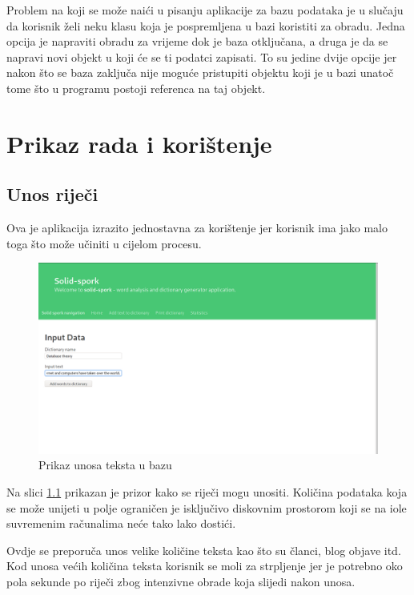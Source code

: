 \documentclass{foi}
\begin{document}
Problem na koji se može naići u pisanju aplikacije za bazu podataka je u
slučaju da korisnik želi neku klasu koja je pospremljena u bazi koristiti za
obradu. Jedna opcija je napraviti obradu za vrijeme dok je baza otključana, a
druga je da se napravi novi objekt u koji će se ti podatci zapisati. To su
jedine dvije opcije jer nakon što se baza zaključa nije moguće pristupiti
objektu koji je u bazi unatoč tome što u programu postoji referenca na taj
objekt.

\chapter{Prikaz rada i korištenje}

\section{Unos riječi}

Ova je aplikacija izrazito jednostavna za korištenje jer korisnik ima jako malo
toga što može učiniti u cijelom procesu.

\begin{figure}[!h]
	\includegraphics[width=\textwidth]{slike/solid-spork-input.png}
	\caption{Prikaz unosa teksta u bazu}
	\label{ht_unos}
\end{figure}

Na slici \ref{ht_unos} prikazan je prizor kako se riječi mogu unositi. Količina
podataka koja se može unijeti u polje ograničen je isključivo diskovnim
prostorom koji se na iole suvremenim računalima neće tako lako dostići.

Ovdje se preporuča unos velike količine teksta kao što su članci, blog objave
itd. Kod unosa većih količina teksta korisnik se moli za strpljenje jer je
potrebno oko pola sekunde po riječi zbog intenzivne obrade koja slijedi
nakon unosa.
\end{document}

